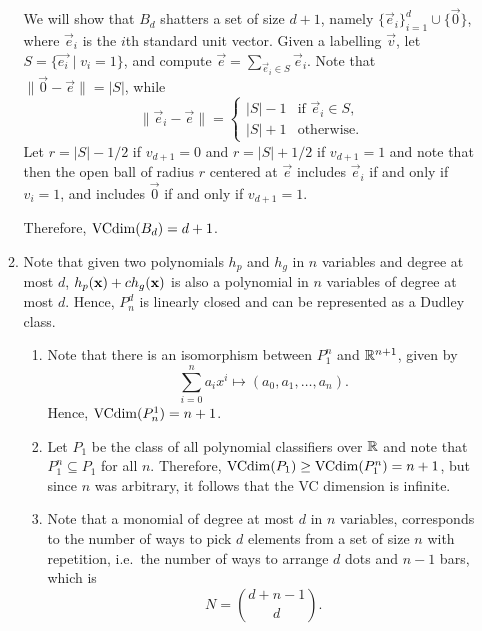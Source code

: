 \begin{ex}
\begin{enumerate}
\begin{enumerate}[1.]
                  We will show that $B_d$ shatters a set of size $d+1$, namely
                  $\{\vec{e}_i\}_{i=1}^{d}\cup\{\vec{0}\}$, where $\vec{e}_i$ is
                  the $i$th standard unit vector. Given a labelling $\vec{v}$,
                  let $S=\{\vec{e_i} \mid v_i=1\}$, and compute
                  $\vec{e}=\sum_{\vec{e}_i\in S} \vec{e}_i$. Note that
                  $\|\vec{0}-\vec{e}\|=|S|$, while
                  \[
                    \|\vec{e}_i-\vec{e}\|=\begin{cases}
                      |S|-1 & \text{if $\vec{e}_i\in S$}, \\
                      |S|+1 & \text{otherwise}.
                    \end{cases}
                  \]
                  Let $r=|S|-1/2$ if $v_{d+1}=0$ and $r=|S|+1/2$ if $v_{d+1}=1$
                  and note that then the open ball of radius $r$ centered at
                  $\vec{e}$ includes $\vec{e}_i$ if and only if $v_i=1$, and
                  includes $\vec{0}$ if and only if $v_{d+1}=1$.

                  Therefore, $\operatorname{VCdim}(B_d)=d+1$.
            \item Note that given two polynomials $h_p$ and $h_g$ in $n$
                  variables and degree at most $d$, $h_p(\mathbf{x})+ch_g(\mathbf{x})$ is also
                  a polynomial in $n$ variables of degree at most $d$. Hence,
                  $P^d_n$ is linearly closed and can be represented as a Dudley
                  class.
                  \begin{enumerate}[1.]
                    \item Note that there is an isomorphism between $P_1^n$ and
                          $\mathbb{R}^{n+1}$, given by
                          \[
                            \sum_{i=0}^n a_ix^i \mapsto (a_0, a_1, \ldots, a_n).
                          \]
                          Hence, $\operatorname{VCdim}(P^1_n)=n+1$.
                    \item Let $P_1$ be the class of all polynomial classifiers
                          over $\mathbb{R}$ and note that $P_1^n\subseteq P_1$ for all
                          $n$. Therefore, $\operatorname{VCdim}(P_1)\geq \operatorname{VCdim}(P_1^n)=n+1$,
                          but since $n$ was arbitrary, it follows that the VC
                          dimension is infinite.
                    \item Note that a monomial of degree at most $d$ in $n$
                          variables, corresponds to the number of ways to pick
                          $d$ elements from a set of size $n$ with repetition,
                          i.e.\ the number of ways to arrange $d$ dots and $n-1$
                          bars, which is
                          \[
                            N=\binom{d+n-1}{d}.
                          \]


\end{enumerate}
\end{enumerate}
\end{enumerate}
\end{ex}
